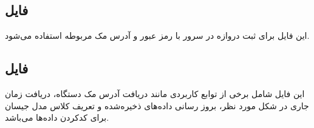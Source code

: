 \subsection{فایل }

این فایل برای ثبت دروازه در سرور با رمز عبور و آدرس مک مربوطه استفاده می‌شود.

\subsection{فایل }

این فایل شامل برخی از توابع کاربردی مانند دریافت آدرس مک دستگاه، دریافت زمان جاری در شکل مورد نظر، بروز رسانی داده‌های ذخیره‌شده و تعریف کلاس مدل جیسان برای کد‌کردن داده‌ها می‌باشد.



